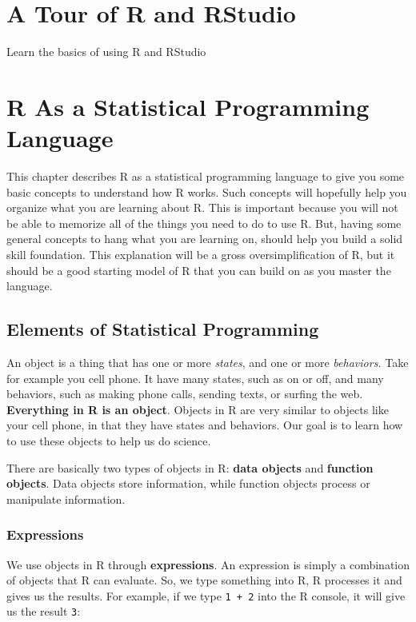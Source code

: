 \documentclass[
]{book}
\begin{document}
\hypertarget{tour}{%
\chapter{A Tour of R and RStudio}\label{tour}}

Learn the basics of using R and RStudio

\hypertarget{raspl}{%
\chapter{R As a Statistical Programming Language}\label{raspl}}

This chapter describes R as a statistical programming language to give you some basic concepts to understand how R works.
Such concepts will hopefully help you organize what you are learning about R.
This is important because you will not be able to memorize all of the things you need to do to use R.
But, having some general concepts to hang what you are learning on, should help you build a solid skill foundation.
This explanation will be a gross oversimplification of R, but it should be a good starting model of R that you can build on as you master the language.

\hypertarget{elements-of-statistical-programming}{%
\section{Elements of Statistical Programming}\label{elements-of-statistical-programming}}

An object is a thing that has one or more \emph{states}, and one or more \emph{behaviors.}
Take for example you cell phone.
It have many states, such as on or off, and many behaviors, such as making phone calls, sending texts, or surfing the web.
\textbf{Everything in R is an object}.
Objects in R are very similar to objects like your cell phone, in that they have states and behaviors.
Our goal is to learn how to use these objects to help us do science.

There are basically two types of objects in R: \textbf{data objects} and \textbf{function objects}.
Data objects store information, while function objects process or manipulate information.

\hypertarget{expressions}{%
\subsection{Expressions}\label{expressions}}

We use objects in R through \textbf{expressions}.
An expression is simply a combination of objects that R can evaluate.
So, we type something into R, R processes it and gives us the results.
For example, if we type \texttt{1\ +\ 2} into the R console, it will give us the result \texttt{3}:
\end{document}
